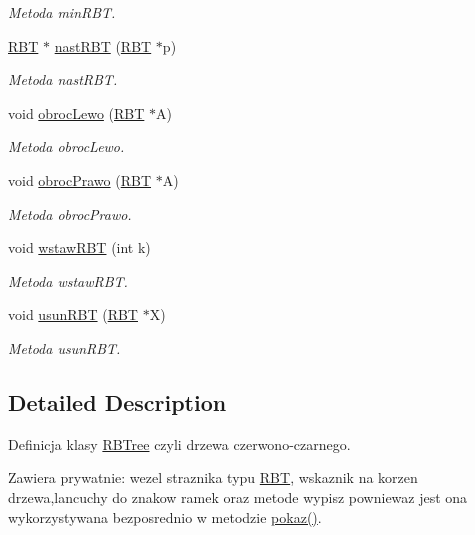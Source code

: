 \begin{DoxyCompactItemize}
\begin{DoxyCompactList}\small\item\em Metoda min\-R\-B\-T. \end{DoxyCompactList}\item 
\hyperlink{struct_r_b_t}{R\-B\-T} $\ast$ \hyperlink{class_r_b_tree_a29205faf915948214bc665cd1b7d677b}{nast\-R\-B\-T} (\hyperlink{struct_r_b_t}{R\-B\-T} $\ast$p)
\begin{DoxyCompactList}\small\item\em Metoda nast\-R\-B\-T. \end{DoxyCompactList}\item 
void \hyperlink{class_r_b_tree_a9261b9851788e84fcc65bab5d7366e71}{obroc\-Lewo} (\hyperlink{struct_r_b_t}{R\-B\-T} $\ast$A)
\begin{DoxyCompactList}\small\item\em Metoda obroc\-Lewo. \end{DoxyCompactList}\item 
void \hyperlink{class_r_b_tree_aa75e696ec484d9e0e8a1691abbbf0690}{obroc\-Prawo} (\hyperlink{struct_r_b_t}{R\-B\-T} $\ast$A)
\begin{DoxyCompactList}\small\item\em Metoda obroc\-Prawo. \end{DoxyCompactList}\item 
void \hyperlink{class_r_b_tree_a80c610d8f07a6aba183711da6887be00}{wstaw\-R\-B\-T} (int k)
\begin{DoxyCompactList}\small\item\em Metoda wstaw\-R\-B\-T. \end{DoxyCompactList}\item 
void \hyperlink{class_r_b_tree_a88580c2202ca698a24a960a039846c14}{usun\-R\-B\-T} (\hyperlink{struct_r_b_t}{R\-B\-T} $\ast$X)
\begin{DoxyCompactList}\small\item\em Metoda usun\-R\-B\-T. \end{DoxyCompactList}\end{DoxyCompactItemize}


\subsection{Detailed Description}
Definicja klasy \hyperlink{class_r_b_tree}{R\-B\-Tree} czyli drzewa czerwono-\/czarnego. 

Zawiera prywatnie\-: wezel straznika typu \hyperlink{struct_r_b_t}{R\-B\-T}, wskaznik na korzen drzewa,lancuchy do znakow ramek oraz metode wypisz powniewaz jest ona wykorzystywana bezposrednio w metodzie \hyperlink{class_r_b_tree_ac63299809d5769a670ced90f4dfe39d3}{pokaz()}. 

